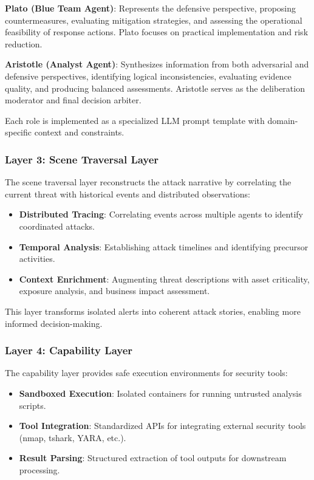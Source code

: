 \textbf{Plato (Blue Team Agent)}: Represents the defensive perspective, proposing countermeasures, evaluating mitigation strategies, and assessing the operational feasibility of response actions. Plato focuses on practical implementation and risk reduction.

\textbf{Aristotle (Analyst Agent)}: Synthesizes information from both adversarial and defensive perspectives, identifying logical inconsistencies, evaluating evidence quality, and producing balanced assessments. Aristotle serves as the deliberation moderator and final decision arbiter.

Each role is implemented as a specialized LLM prompt template with domain-specific context and constraints.

\subsubsection{Layer 3: Scene Traversal Layer}
\label{subsubsec:layer3}

The scene traversal layer reconstructs the attack narrative by correlating the current threat with historical events and distributed observations:

\begin{itemize}
    \item \textbf{Distributed Tracing}: Correlating events across multiple agents to identify coordinated attacks.
    \item \textbf{Temporal Analysis}: Establishing attack timelines and identifying precursor activities.
    \item \textbf{Context Enrichment}: Augmenting threat descriptions with asset criticality, exposure analysis, and business impact assessment.
\end{itemize}

This layer transforms isolated alerts into coherent attack stories, enabling more informed decision-making.

\subsubsection{Layer 4: Capability Layer}
\label{subsubsec:layer4}

The capability layer provides safe execution environments for security tools:

\begin{itemize}
    \item \textbf{Sandboxed Execution}: Isolated containers for running untrusted analysis scripts.
    \item \textbf{Tool Integration}: Standardized APIs for integrating external security tools (nmap, tshark, YARA, etc.).
    \item \textbf{Result Parsing}: Structured extraction of tool outputs for downstream processing.
\end{itemize}

